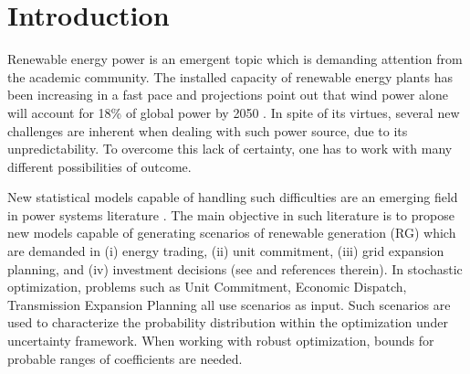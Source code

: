 \section{Introduction}


Renewable energy power is an emergent topic which is demanding attention from the academic community. %
The installed capacity of renewable energy plants has been increasing in a fast pace and projections point out that wind power alone will account for 18\% of global power by 2050 \cite{IntEnerAgency}.
In spite of its virtues, several new challenges are inherent when dealing with such power source, due to its unpredictability. To overcome this lack of certainty, one has to work with many different possibilities of outcome.

New statistical models capable of handling such difficulties are an emerging field in power systems literature \cite{bessa2012time, gallego2016line,moller_time-adaptive_2008,nielsen2006,bremnes_probabilistic_2004,wan_direct_2017}. 
The main objective in such literature is to propose new models capable of generating scenarios of renewable generation (RG) which are demanded in (i) energy trading, (ii) unit commitment, (iii) grid expansion planning, and (iv) investment decisions (see \cite{moreiraStreet,jabr2013robust,zhaoguan,Aderson2017} and references therein). 
In stochastic optimization, problems such as Unit Commitment, Economic Dispatch, Transmission Expansion Planning all use scenarios as input. 
Such scenarios are used to characterize the probability distribution within the optimization under uncertainty framework.
When working with robust optimization, bounds for probable ranges of coefficients are needed.

 
